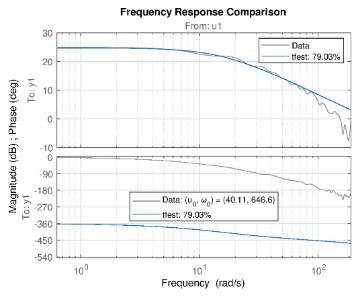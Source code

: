 \begin{figure}[H]
\begin{minipage}{0.32\textwidth}
\begin{figure}[H]
       \end{figure}
    \end{minipage}
    \begin{minipage}{0.32\textwidth}
       \begin{figure}[H]
            \includegraphics[width = \textwidth]{./figs/small_perturbation/freq_Compare_1500.eps}
       \end{figure}
    \end{minipage}
\end{figure}
